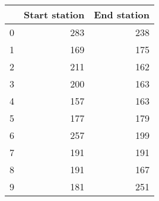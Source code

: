 \begin{tabular}{lrr}
\toprule
 & Start station & End station \\
\midrule
0 & 283 & 238 \\
1 & 169 & 175 \\
2 & 211 & 162 \\
3 & 200 & 163 \\
4 & 157 & 163 \\
5 & 177 & 179 \\
6 & 257 & 199 \\
7 & 191 & 191 \\
8 & 191 & 167 \\
9 & 181 & 251 \\
\bottomrule
\end{tabular}
